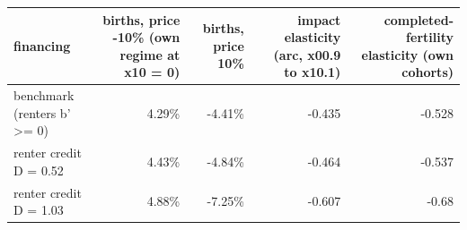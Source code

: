 \begin{tabular}{lrrrr}
\toprule
financing & births, price -10\% (own regime at x10 = 0) & births, price 10\% & impact elasticity (arc, x00.9 to x10.1) & completed-fertility elasticity (own cohorts) \\
\midrule
benchmark (renters b' >= 0) & 4.29\% & -4.41\% & -0.435 & -0.528 \\
renter credit D = 0.52 & 4.43\% & -4.84\% & -0.464 & -0.537 \\
renter credit D = 1.03 & 4.88\% & -7.25\% & -0.607 & -0.68 \\
\bottomrule
\end{tabular}
